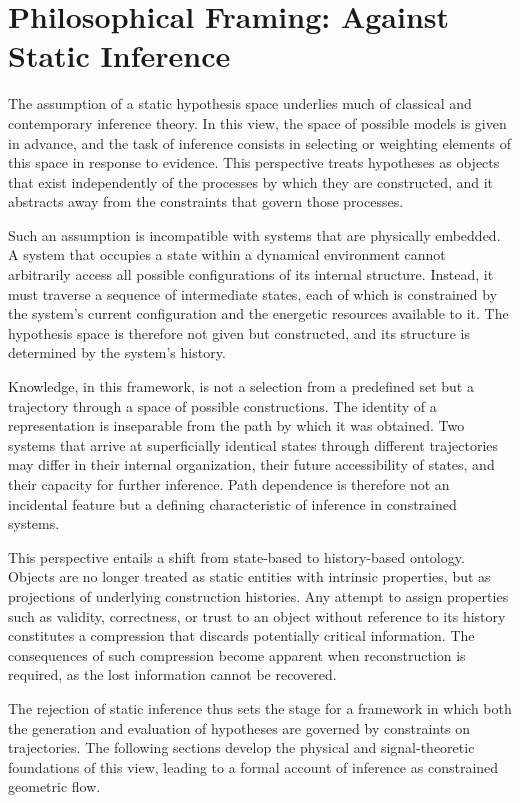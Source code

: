 \documentclass[12pt]{article}
\theoremstyle{plain}
\theoremstyle{definition}
\theoremstyle{remark}
\begin{document}
\section{Philosophical Framing: Against Static Inference}

The assumption of a static hypothesis space underlies much of classical and contemporary inference theory. In this view, the space of possible models is given in advance, and the task of inference consists in selecting or weighting elements of this space in response to evidence. This perspective treats hypotheses as objects that exist independently of the processes by which they are constructed, and it abstracts away from the constraints that govern those processes.

Such an assumption is incompatible with systems that are physically embedded. A system that occupies a state within a dynamical environment cannot arbitrarily access all possible configurations of its internal structure. Instead, it must traverse a sequence of intermediate states, each of which is constrained by the system's current configuration and the energetic resources available to it. The hypothesis space is therefore not given but constructed, and its structure is determined by the system's history.

Knowledge, in this framework, is not a selection from a predefined set but a trajectory through a space of possible constructions. The identity of a representation is inseparable from the path by which it was obtained. Two systems that arrive at superficially identical states through different trajectories may differ in their internal organization, their future accessibility of states, and their capacity for further inference. Path dependence is therefore not an incidental feature but a defining characteristic of inference in constrained systems.

This perspective entails a shift from state-based to history-based ontology. Objects are no longer treated as static entities with intrinsic properties, but as projections of underlying construction histories. Any attempt to assign properties such as validity, correctness, or trust to an object without reference to its history constitutes a compression that discards potentially critical information. The consequences of such compression become apparent when reconstruction is required, as the lost information cannot be recovered.

The rejection of static inference thus sets the stage for a framework in which both the generation and evaluation of hypotheses are governed by constraints on trajectories. The following sections develop the physical and signal-theoretic foundations of this view, leading to a formal account of inference as constrained geometric flow.
\end{document}

